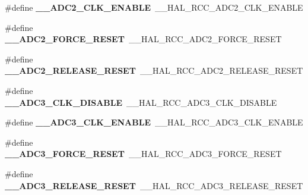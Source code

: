 \begin{DoxyCompactItemize}
\item 
\hypertarget{group___h_a_l___r_c_c___aliased_ga926fc527f079e5e0b3c57b899d32188c}{\#define {\bfseries \-\_\-\-\_\-\-A\-D\-C2\-\_\-\-C\-L\-K\-\_\-\-E\-N\-A\-B\-L\-E}~\-\_\-\-\_\-\-H\-A\-L\-\_\-\-R\-C\-C\-\_\-\-A\-D\-C2\-\_\-\-C\-L\-K\-\_\-\-E\-N\-A\-B\-L\-E}\label{group___h_a_l___r_c_c___aliased_ga926fc527f079e5e0b3c57b899d32188c}

\item 
\hypertarget{group___h_a_l___r_c_c___aliased_ga8fff7cb98695cd6db61d658e07b3f7a0}{\#define {\bfseries \-\_\-\-\_\-\-A\-D\-C2\-\_\-\-F\-O\-R\-C\-E\-\_\-\-R\-E\-S\-E\-T}~\-\_\-\-\_\-\-H\-A\-L\-\_\-\-R\-C\-C\-\_\-\-A\-D\-C2\-\_\-\-F\-O\-R\-C\-E\-\_\-\-R\-E\-S\-E\-T}\label{group___h_a_l___r_c_c___aliased_ga8fff7cb98695cd6db61d658e07b3f7a0}

\item 
\hypertarget{group___h_a_l___r_c_c___aliased_ga950dedd481bcb1024279b78abc7f80d9}{\#define {\bfseries \-\_\-\-\_\-\-A\-D\-C2\-\_\-\-R\-E\-L\-E\-A\-S\-E\-\_\-\-R\-E\-S\-E\-T}~\-\_\-\-\_\-\-H\-A\-L\-\_\-\-R\-C\-C\-\_\-\-A\-D\-C2\-\_\-\-R\-E\-L\-E\-A\-S\-E\-\_\-\-R\-E\-S\-E\-T}\label{group___h_a_l___r_c_c___aliased_ga950dedd481bcb1024279b78abc7f80d9}

\item 
\hypertarget{group___h_a_l___r_c_c___aliased_ga05c6b7d579c500a86114a5e70421e154}{\#define {\bfseries \-\_\-\-\_\-\-A\-D\-C3\-\_\-\-C\-L\-K\-\_\-\-D\-I\-S\-A\-B\-L\-E}~\-\_\-\-\_\-\-H\-A\-L\-\_\-\-R\-C\-C\-\_\-\-A\-D\-C3\-\_\-\-C\-L\-K\-\_\-\-D\-I\-S\-A\-B\-L\-E}\label{group___h_a_l___r_c_c___aliased_ga05c6b7d579c500a86114a5e70421e154}

\item 
\hypertarget{group___h_a_l___r_c_c___aliased_ga96ef8d5f9623cc70e65c86d0806e3e86}{\#define {\bfseries \-\_\-\-\_\-\-A\-D\-C3\-\_\-\-C\-L\-K\-\_\-\-E\-N\-A\-B\-L\-E}~\-\_\-\-\_\-\-H\-A\-L\-\_\-\-R\-C\-C\-\_\-\-A\-D\-C3\-\_\-\-C\-L\-K\-\_\-\-E\-N\-A\-B\-L\-E}\label{group___h_a_l___r_c_c___aliased_ga96ef8d5f9623cc70e65c86d0806e3e86}

\item 
\hypertarget{group___h_a_l___r_c_c___aliased_gad312edcb949947577c55a2d45a9518ac}{\#define {\bfseries \-\_\-\-\_\-\-A\-D\-C3\-\_\-\-F\-O\-R\-C\-E\-\_\-\-R\-E\-S\-E\-T}~\-\_\-\-\_\-\-H\-A\-L\-\_\-\-R\-C\-C\-\_\-\-A\-D\-C3\-\_\-\-F\-O\-R\-C\-E\-\_\-\-R\-E\-S\-E\-T}\label{group___h_a_l___r_c_c___aliased_gad312edcb949947577c55a2d45a9518ac}

\item 
\hypertarget{group___h_a_l___r_c_c___aliased_ga7a8f6b458fbba95a8649e1989b58eaf5}{\#define {\bfseries \-\_\-\-\_\-\-A\-D\-C3\-\_\-\-R\-E\-L\-E\-A\-S\-E\-\_\-\-R\-E\-S\-E\-T}~\-\_\-\-\_\-\-H\-A\-L\-\_\-\-R\-C\-C\-\_\-\-A\-D\-C3\-\_\-\-R\-E\-L\-E\-A\-S\-E\-\_\-\-R\-E\-S\-E\-T}\label{group___h_a_l___r_c_c___aliased_ga7a8f6b458fbba95a8649e1989b58eaf5}


\end{DoxyCompactItemize}
